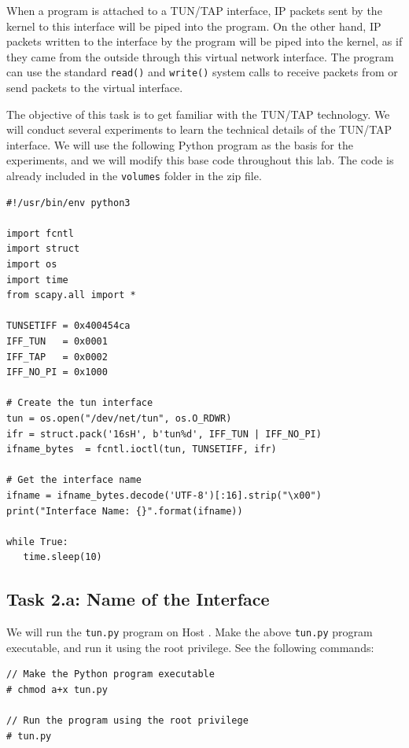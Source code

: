When a program is attached to a TUN/TAP interface, IP packets sent by
the kernel to this interface will be piped into the 
program. On the other hand, IP packets written to the 
interface by the program will be piped into the kernel, as if they came from 
the outside through this virtual network interface. The program can use 
the standard {\tt read()} and {\tt write()} system calls to receive packets 
from or send packets to the virtual interface.


The objective of this task is to get familiar with the TUN/TAP technology. 
We will conduct several experiments to learn the technical details
of the TUN/TAP interface. We will use the following Python program
as the basis for the experiments, and we will modify this base 
code throughout this lab. The code is already included 
in the \texttt{volumes} folder in the zip file.  


\begin{lstlisting}[caption={Creating a TUN interface (\texttt{tun.py})}, label=vpn:list:create_tun]
#!/usr/bin/env python3

import fcntl
import struct
import os
import time
from scapy.all import *

TUNSETIFF = 0x400454ca
IFF_TUN   = 0x0001
IFF_TAP   = 0x0002
IFF_NO_PI = 0x1000

# Create the tun interface
tun = os.open("/dev/net/tun", os.O_RDWR)
ifr = struct.pack('16sH', b'tun%d', IFF_TUN | IFF_NO_PI)
ifname_bytes  = fcntl.ioctl(tun, TUNSETIFF, ifr)

# Get the interface name
ifname = ifname_bytes.decode('UTF-8')[:16].strip("\x00")
print("Interface Name: {}".format(ifname))

while True:
   time.sleep(10)
\end{lstlisting}
 


\subsection{Task 2.a: Name of the Interface} 

We will run the \texttt{tun.py} program on Host \hostu.  
Make the above \texttt{tun.py} program executable, and run it using the 
root privilege. See the following commands: 

\begin{lstlisting}
// Make the Python program executable 
# chmod a+x tun.py

// Run the program using the root privilege
# tun.py
\end{lstlisting}
 

